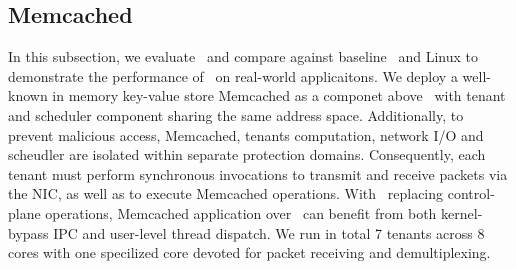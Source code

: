 

\subsection{Memcached}
\label{ss:memcached}
In this subsection, we evaluate \name\ and compare against baseline \cos\ and Linux to demonstrate the performance of \name\ on real-world applicaitons.
We deploy a well-known in memory key-value store Memcached as a componet above \name\ with tenant and scheduler component sharing the same address space.
Additionally, to prevent malicious access, Memcached, tenants computation, network I/O and scheudler are isolated within separate protection domains.
Consequently, each tenant must perform synchronous invocations to transmit and receive packets via the NIC, as well as to execute Memcached operations.
With \name\ replacing control-plane operations, Memcached application over \name\ can benefit from both kernel-bypass IPC and user-level thread dispatch.
We run in total 7 tenants across 8 cores with one specilized core devoted for packet receiving and demultiplexing.

